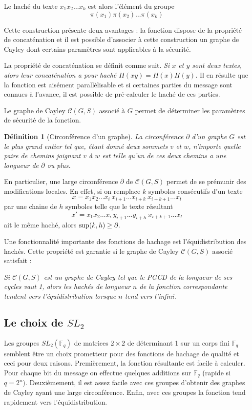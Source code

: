 \documentclass[a4paper,10pt]{article}
\theoremstyle{break}
\newcommand{\C}{\mathcal{C}}
\newcommand{\F}{\mathbb{F}}
\newtheorem{mydef}{Définition}
\begin{document}
\begin{multicols}{2}
Le haché du texte $x_1x_2 \ldots x_k$ est alors l'élément du groupe 
$$\pi(x_1)\pi(x_2) \ldots \pi(x_k)$$

Cette construction présente deux avantages : la fonction dispose de la propriété de concaténation et 
il est possible d'associer à cette construction un graphe de Cayley dont certains paramètres sont 
applicables à la sécurité.

La propriété de concaténation se définit comme suit. \textit{Si $x$ et $y$ sont deux textes, alors leur
concaténation a pour haché $H(xy) = H(x)H(y)$.} Il en résulte que la fonction est aisément parallèlisable
et si certaines parties du message sont connues à l'avance, il est possible de pré-calculer le haché de 
ces parties.

Le graphe de Cayley $\C(G,S)$ associé à $G$ permet de déterminer les paramètres de sécurité de la fonction. 

\begin{mydef}[Circonférence d'un graphe]
 La circonférence $\partial$ d'un graphe $G$ est le plus grand entier tel que, étant donné deux sommets $v$ et $w$,
 n'importe quelle paire de chemins joignant $v$ à $w$ est telle qu'un de ces deux chemins a une longueur
 de $\partial$ ou plus.
\end{mydef}

En particulier, une large circonférence $\partial$ de $\C(G,S)$ permet de se prémunir des modifications 
locales. En effet, si on remplace $k$ symboles consécutifs d'un texte 
$$ x = x_1x_2 \ldots x_i \ \boxed{x_{i+1} \ldots x_{i+k}} \ x_{i+k+1} \ldots x_t $$
par une chaine de $h$ symboles telle que le texte résultant
$$ x' = x_1x_2 \ldots x_i \ \boxed{y_{i+1} \ldots y_{i+h}} \ x_{i+k+1} \ldots x_t $$
ait le même haché, alors ${\rm sup}(k, h) \ge \partial$.

Une fonctionnalité importante des fonctions de hachage est l'équidistribution des hachés. Cette propriété 
est garantie si le graphe de Cayley $\C(G,S)$ associé satisfait :

\textit{Si $\C(G,S)$ est un graphe de Cayley tel que le PGCD de la longueur de ses cycles vaut 1, alors les hachés de 
longueur $n$ de la fonction correspondante tendent vers l'équidistribution lorsque $n$ tend vers l'infini.}

\subsection{Le choix de $SL_2$}
Les groupes $SL_2(\F_q)$ de matrices $2 \times 2$ de déterminant 1 sur un corps fini $\F_q$ semblent être 
un choix prometteur pour des fonctions de hachage de qualité et ceci pour deux raisons. Premièrement, 
la fonction résultante est facile à calculer. Pour chaque bit du message on effectue quelques additions
sur $\F_q$ (rapide si $q=2^n$). Deuxièmement, il est assez facile avec ces groupes d'obtenir des graphes 
de Cayley ayant une large circonférence. Enfin, avec ces groupes la fonction tend rapidement vers 
l'équidistribution.


\end{multicols}
\end{document}
